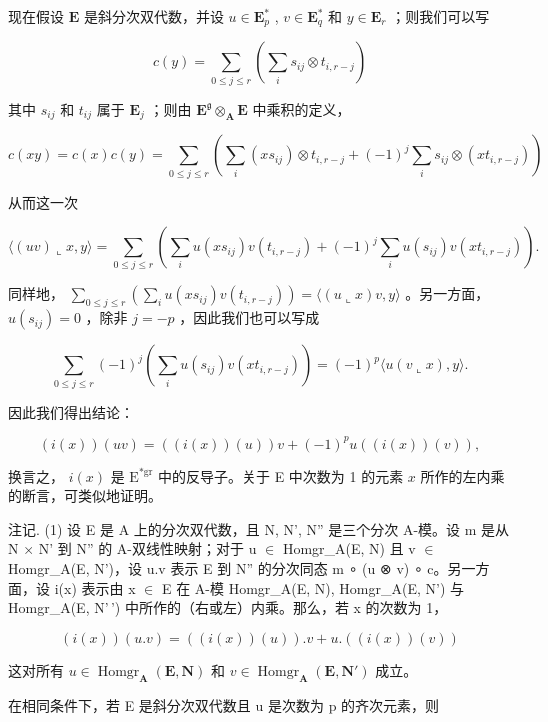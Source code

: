 现在假设 \(\mathbf{E}\) 是斜分次双代数，并设 \(u\in \mathbf{E}_p^*\) , \(v\in \mathbf{E}_q^*\) 和 \(y\in \mathbf{E}_r\) ；则我们可以写

\[
c (y) = \sum_ {0 \leqslant j \leqslant r} \left(\sum_ {i} s _ {i j} \otimes t _ {i, r - j}\right)
\]

其中 \(s_{ij}\) 和 \(t_{ij}\) 属于 \(\mathbf{E}_j\) ；则由 \(\mathbf{E}^{\mathfrak{g}} \otimes_{\mathbf{A}} \mathbf{E}\) 中乘积的定义，

\[
c (x y) = c (x) c (y) = \sum_ {0 \leqslant j \leqslant r} \left(\sum_ {i} \left(x s _ {i j}\right) \otimes t _ {i, r - j} + (- 1) ^ {j} \sum_ {i} s _ {i j} \otimes \left(x t _ {i, r - j}\right)\right)
\]

从而这一次

\[
\langle (u v) \llcorner x, y \rangle = \sum_ {0 \leqslant j \leqslant r} \left(\sum_ {i} u \left(x s _ {i j}\right) v \left(t _ {i, r - j}\right) + (- 1) ^ {j} \sum_ {i} u \left(s _ {i j}\right) v \left(x t _ {i, r - j}\right)\right).
\]

同样地， \(\sum_{0\leqslant j\leqslant r}\left(\sum_{i}u(xs_{ij})v(t_{i,r - j})\right) = \langle (u\llcorner x)v,y\rangle\) 。另一方面， \(u(s_{ij}) = 0\) ，除非 \(j = -p\) ，因此我们也可以写成

\[
\sum_ {0 \leqslant j \leqslant r} (- 1) ^ {j} \left(\sum_ {i} u (s _ {i j}) v (x t _ {i, r - j})\right) = (- 1) ^ {p} \langle u (v \llcorner x), y \rangle .
\]

因此我们得出结论：

\[
(i (x)) (u v) = ((i (x)) (u)) v + (- 1) ^ {p} u ((i (x)) (v)),\tag{65}
\]

换言之， \(i(x)\) 是 \(\mathrm{E}^{*\mathrm{gr}}\) 中的反导子。关于 E 中次数为 1 的元素 \(x\) 所作的左内乘的断言，可类似地证明。

注记. (1) 设 E 是 A 上的分次双代数，且 N, N', N'' 是三个分次 A-模。设 m 是从 N × N' 到 N'' 的 A-双线性映射；对于 u \ensuremath{\in} Homgr\_A(E, N) 且 v \ensuremath{\in} Homgr\_A(E, N')，设 u.v 表示 E 到 N'' 的分次同态 m ∘ (u ⊗ v) ∘ c。另一方面，设 i(x) 表示由 x \ensuremath{\in} E 在 A-模 Homgr\_A(E, N), Homgr\_A(E, N') 与 Homgr\_A(E, N'\,') 中所作的（右或左）内乘。那么，若 x 的次数为 1，

\[
(i (x)) (u. v) = ((i (x)) (u)). v + u. ((i (x)) (v))
\]

这对所有 \(u \in \operatorname{Homgr}_{\mathbf{A}}(\mathbf{E}, \mathbf{N})\) 和 \(v \in \operatorname{Homgr}_{\mathbf{A}}(\mathbf{E}, \mathbf{N}')\) 成立。

在相同条件下，若 E 是斜分次双代数且 u 是次数为 p 的齐次元素，则

